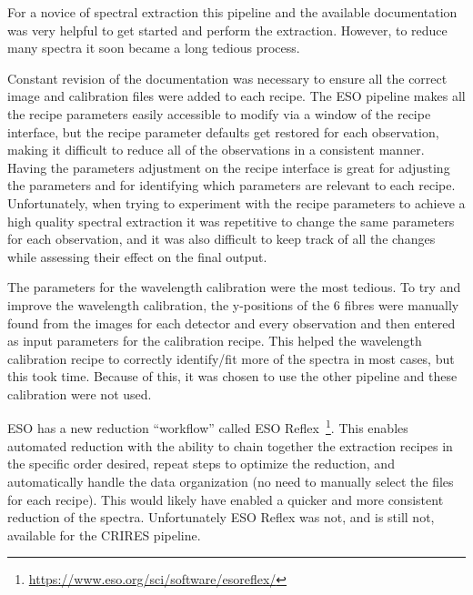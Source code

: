 For a novice of spectral extraction this pipeline and the available documentation was very helpful to get started and perform the extraction.
However, to reduce many spectra it soon became a long tedious process.

Constant revision of the documentation was necessary to ensure all the correct image and calibration files were added to each recipe.
The {ESO} pipeline makes all the recipe parameters easily accessible to modify via a window of the recipe interface, but the recipe parameter defaults get restored for each observation, making it difficult to reduce all of the observations in a consistent manner.
Having the parameters adjustment on the recipe interface is great for adjusting the parameters and for identifying which parameters are relevant to each recipe.
Unfortunately, when trying to experiment with the recipe parameters to achieve a high quality spectral extraction it was repetitive to change the same parameters for each observation, and it was also difficult to keep track of all the changes while assessing their effect on the final output.

The parameters for the wavelength calibration were the most tedious.
To try and improve the wavelength calibration, the {y-positions} of the 6 \thar{} fibres were manually found from the images for each detector and every observation and then entered as input parameters for the calibration recipe.
This helped the wavelength calibration recipe to correctly identify/fit more of the \thar{} spectra in most cases, but this took time.
Because of this, it was chosen to use the other pipeline and these calibration were not used.

{ESO} has a new reduction ``workflow'' called {ESO} Reflex~\citep{freudling_automated_2013}\footnote{\href{https://www.eso.org/sci/software/esoreflex/}{https://www.eso.org/sci/software/esoreflex/}}.
This enables automated reduction with the ability to chain together the extraction recipes in the specific order desired, repeat steps to optimize the reduction, and automatically handle the data organization (no need to manually select the files for each recipe).
This would likely have enabled a quicker and more consistent reduction of the spectra.
Unfortunately {ESO} Reflex was not, and is still not, available for the {CRIRES} pipeline.

